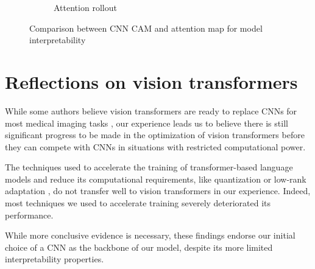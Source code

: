 \begin{figure}[tb]
\begin{subfigure}[b]{0.32\textwidth}
         \caption{Attention rollout}
    \end{subfigure}
    \caption{Comparison between CNN CAM and attention map for model interpretability}
    \label{fig:attention_comparison}
\end{figure}

\section{Reflections on vision transformers}
While some authors believe vision transformers are ready to replace CNNs for most medical imaging tasks \cite{matsoukas2021time}, our experience leads  us to believe there is still significant progress to be made in the optimization of vision transformers before they can compete with CNNs in situations with restricted computational power.

The techniques used to accelerate the training of transformer-based language models and reduce its computational requirements, like quantization \cite{dettmers2022llm} or low-rank adaptation \cite{hu2021lora}, do not transfer well to vision transformers in our experience. Indeed, most techniques we used to accelerate training severely deteriorated its performance.

While more conclusive evidence is necessary, these findings endorse our initial choice of a CNN as the backbone of our model, despite its more limited interpretability properties.

